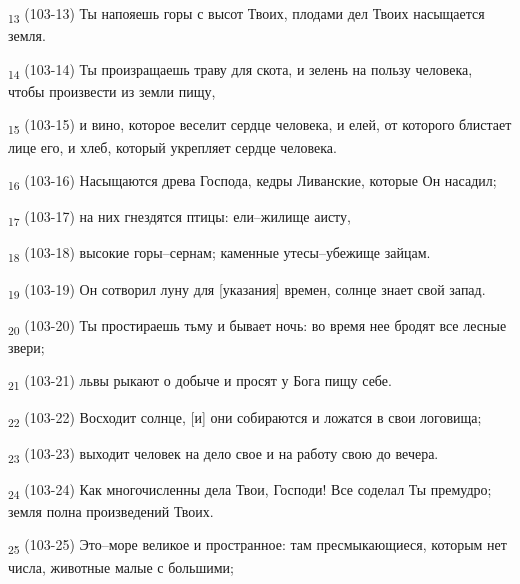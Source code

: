 \begin{tcolorbox}
\textsubscript{13} (103-13) Ты напояешь горы с высот Твоих, плодами дел Твоих насыщается земля.
\end{tcolorbox}
\begin{tcolorbox}
\textsubscript{14} (103-14) Ты произращаешь траву для скота, и зелень на пользу человека, чтобы произвести из земли пищу,
\end{tcolorbox}
\begin{tcolorbox}
\textsubscript{15} (103-15) и вино, которое веселит сердце человека, и елей, от которого блистает лице его, и хлеб, который укрепляет сердце человека.
\end{tcolorbox}
\begin{tcolorbox}
\textsubscript{16} (103-16) Насыщаются древа Господа, кедры Ливанские, которые Он насадил;
\end{tcolorbox}
\begin{tcolorbox}
\textsubscript{17} (103-17) на них гнездятся птицы: ели--жилище аисту,
\end{tcolorbox}
\begin{tcolorbox}
\textsubscript{18} (103-18) высокие горы--сернам; каменные утесы--убежище зайцам.
\end{tcolorbox}
\begin{tcolorbox}
\textsubscript{19} (103-19) Он сотворил луну для [указания] времен, солнце знает свой запад.
\end{tcolorbox}
\begin{tcolorbox}
\textsubscript{20} (103-20) Ты простираешь тьму и бывает ночь: во время нее бродят все лесные звери;
\end{tcolorbox}
\begin{tcolorbox}
\textsubscript{21} (103-21) львы рыкают о добыче и просят у Бога пищу себе.
\end{tcolorbox}
\begin{tcolorbox}
\textsubscript{22} (103-22) Восходит солнце, [и] они собираются и ложатся в свои логовища;
\end{tcolorbox}
\begin{tcolorbox}
\textsubscript{23} (103-23) выходит человек на дело свое и на работу свою до вечера.
\end{tcolorbox}
\begin{tcolorbox}
\textsubscript{24} (103-24) Как многочисленны дела Твои, Господи! Все соделал Ты премудро; земля полна произведений Твоих.
\end{tcolorbox}
\begin{tcolorbox}
\textsubscript{25} (103-25) Это--море великое и пространное: там пресмыкающиеся, которым нет числа, животные малые с большими;
\end{tcolorbox}
